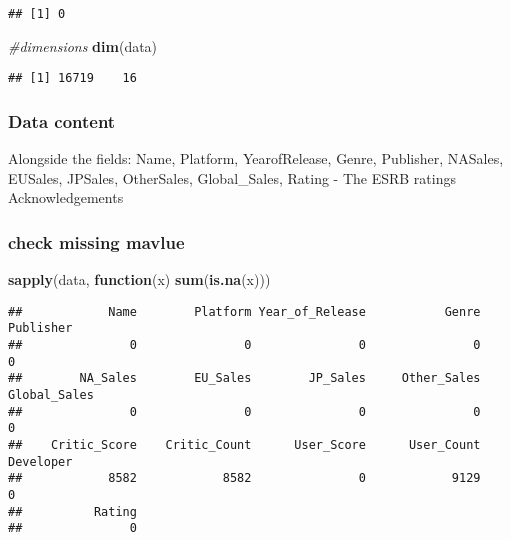 \documentclass[]{article}
\newenvironment{Shaded}{\begin{snugshade}}{\end{snugshade}}
\newcommand{\CommentTok}[1]{\textcolor[rgb]{0.56,0.35,0.01}{\textit{#1}}}
\newcommand{\ControlFlowTok}[1]{\textcolor[rgb]{0.13,0.29,0.53}{\textbf{#1}}}
\newcommand{\KeywordTok}[1]{\textcolor[rgb]{0.13,0.29,0.53}{\textbf{#1}}}
\newcommand{\NormalTok}[1]{#1}
\newcommand{\OperatorTok}[1]{\textcolor[rgb]{0.81,0.36,0.00}{\textbf{#1}}}
\begin{document}
\begin{Shaded}
\end{Shaded}

\begin{verbatim}
## [1] 0
\end{verbatim}

\begin{Shaded}
\begin{Highlighting}[]
 \CommentTok{#dimensions}
 \KeywordTok{dim}\NormalTok{(data)}
\end{Highlighting}
\end{Shaded}

\begin{verbatim}
## [1] 16719    16
\end{verbatim}

\hypertarget{data-content}{%
\subsubsection{Data content}\label{data-content}}

Alongside the fields: Name, Platform, YearofRelease, Genre, Publisher,
NASales, EUSales, JPSales, OtherSales, Global\_Sales, Rating - The ESRB
ratings Acknowledgements

\hypertarget{check-missing-mavlue}{%
\subsubsection{check missing mavlue}\label{check-missing-mavlue}}

\begin{Shaded}
\begin{Highlighting}[]
\KeywordTok{sapply}\NormalTok{(data, }\ControlFlowTok{function}\NormalTok{(x) }\KeywordTok{sum}\NormalTok{(}\KeywordTok{is.na}\NormalTok{(x)))}
\end{Highlighting}
\end{Shaded}

\begin{verbatim}
##            Name        Platform Year_of_Release           Genre       Publisher 
##               0               0               0               0               0 
##        NA_Sales        EU_Sales        JP_Sales     Other_Sales    Global_Sales 
##               0               0               0               0               0 
##    Critic_Score    Critic_Count      User_Score      User_Count       Developer 
##            8582            8582               0            9129               0 
##          Rating 
##               0
\end{verbatim}
\end{document}
